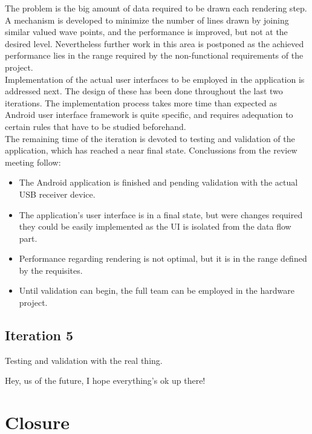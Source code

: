 			The problem is the big amount of data required to be drawn each rendering step. A mechanism is developed to minimize the number of lines drawn by joining similar valued wave points, and the performance is improved, but not at the desired level. Nevertheless further work in this area is postponed as the achieved performance lies in the range required by the non-functional requirements of the project.\\

			Implementation of the actual user interfaces to be employed in the application is addressed next. The design of these has been done throughout the last two iterations. The implementation process takes more time than expected as	Android user interface framework is quite specific, and requires adequation to certain rules that have to be studied beforehand.\\

			The remaining time of the iteration is devoted to testing and validation of the application, which has reached a near final state. Conclussions from the review meeting follow:
			\begin{itemize}
				\item The Android application is finished and pending validation with the actual USB receiver device.
				\item The application's user interface is in a final state, but were changes required they could be easily implemented as the UI is isolated from the data flow part.
				\item Performance regarding rendering is not optimal, but it is in the range defined by the requisites.
				\item Until validation can begin, the full team can be employed in the hardware project.
			\end{itemize}

		\subsection{Iteration 5}
			Testing and validation with the real thing.

			Hey, us of the future, I hope everything's ok up there!
			
	\section{Closure}
